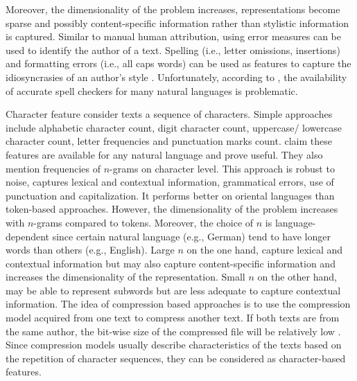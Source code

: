 Moreover, the dimensionality of the problem increases, representations become sparse and possibly content-specific information rather than stylistic information is captured.
Similar to manual human attribution, using error measures can be used to identify the author of a text.
Spelling (i.e., letter omissions, insertions) and formatting errors (i.e., all caps words) can be used as features 
to capture the idiosyncrasies of an author's style \cite{elmanarelbouanani_authorship_2014,bevendorff_overview_2024}.
Unfortunately, according to \cite{stamatatos_survey_2009}, the availability of accurate spell checkers for many natural languages is problematic.


Character feature consider texts a sequence of characters.
Simple approaches include alphabetic character count, digit character count, uppercase/ lowercase character count, letter frequencies and punctuation marks count.
\citet{stamatatos_survey_2009} claim these features are available for any natural language and prove useful.
They also mention frequencies of $n$-grams on character level.
This approach is robust to noise, captures lexical and contextual information, grammatical errors, use of punctuation and capitalization.
It performs better on oriental languages than token-based approaches.
However, the dimensionality of the problem increases with $n$-grams compared to tokens.
Moreover, the choice of $n$ is language-dependent since certain natural language (e.g., German) tend to have longer words than others (e.g., English).
Large $n$ on the one hand, capture lexical and contextual information but may also capture content-specific information and increases the dimensionality of the representation.
Small $n$ on the other hand, may be able to represent subwords but are less adequate to capture contextual information.
The idea of compression based approaches is to use the compression model acquired from one text to compress another text. 
If both texts are from the same author, the bit-wise size of the compressed file will be relatively low \cite{stamatatos_survey_2009,neal_surveying_2018}.
Since compression models usually describe characteristics of the texts based on the repetition of character sequences, 
they can be considered as character-based features. 


